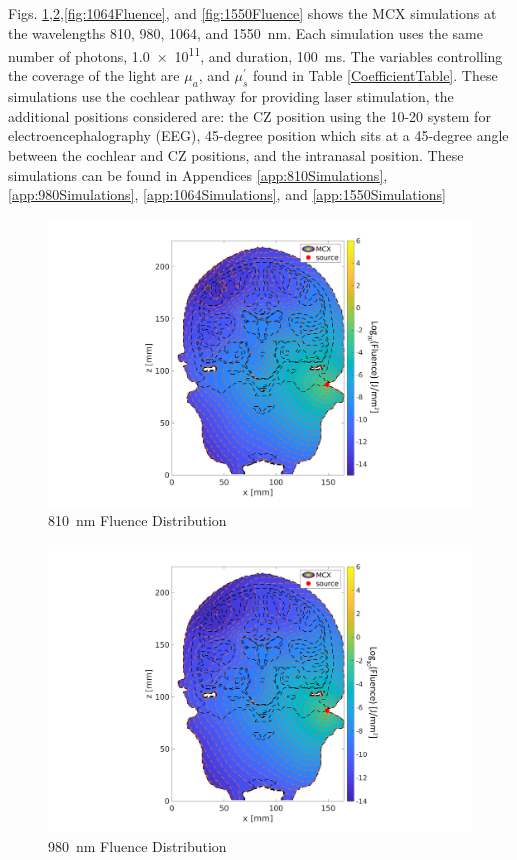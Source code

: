 \documentclass[journal,twoside,web]{ieeecolor}
\begin{document}
Figs. \ref{fig:810Fluence},\ref{fig:980Fluence},\ref{fig:1064Fluence}, and \ref{fig:1550Fluence} shows the MCX simulations at the wavelengths 810, 980, 
1064, and 1550~nm. Each simulation uses the same number of photons, \num{1.0e11}, and duration, \SI{100}{\milli\second}. The variables controlling the 
coverage of the light are $\mu_{a}$, and $\mu_{s}^{'}$ found in Table \ref{CoefficientTable}. These simulations use the cochlear pathway for providing laser 
stimulation, the additional positions considered are: the CZ position using the 10-20 system for electroencephalography (EEG), 45-degree position 
which sits at a 45-degree angle between the cochlear and CZ positions, and the intranasal position. These simulations can be found 
in Appendices \ref{app:810Simulations}, \ref{app:980Simulations}, \ref{app:1064Simulations}, and \ref{app:1550Simulations}

\begin{figure}[hbt!]
    \includegraphics[width=\linewidth]{Figures/Fluence_Distribution_810nm_Cochlear.png}
    \caption{810~nm Fluence Distribution}
    \label{fig:810Fluence}
\end{figure}

\begin{figure}[hbt!]
    \includegraphics[width=\linewidth]{Figures/Fluence_Distribution_980nm_Cochlear.png}
    \caption{980~nm Fluence Distribution}
    \label{fig:980Fluence}
\end{figure}
\end{document}
